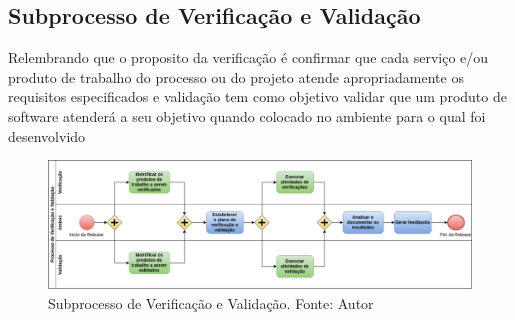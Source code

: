 \subsection{Subprocesso de Verificação e Validação}

Relembrando que o proposito da verificação é confirmar que cada serviço e/ou produto de trabalho do processo ou do
projeto atende apropriadamente os requisitos especificados \cite{pressman1} e validação tem como objetivo validar que um
produto de software atenderá a seu objetivo quando colocado no ambiente para o qual foi desenvolvido \cite{sommerville}

\begin{figure}[h!]
	\centering
  \includegraphics[keepaspectratio=true,scale=0.35]{figuras/VeV.eps}
  \caption[Subprocesso de Verificação e Validação.]{Subprocesso de Verificação e Validação. Fonte: Autor}
	\label{fig:vev}
\end{figure}

